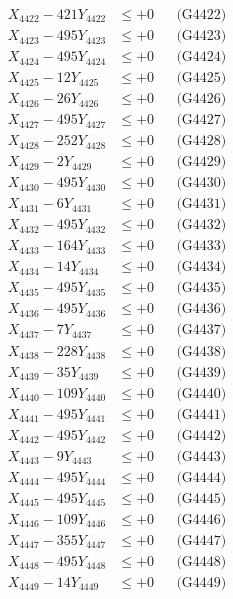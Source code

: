 \documentclass[a4paper,10pt]{article}
\begin{document}
{\begin{align}
X_{4422} - 421Y_{4422} &\leq +0 && \text{(G4422)} \\
X_{4423} - 495Y_{4423} &\leq +0 && \text{(G4423)} \\
X_{4424} - 495Y_{4424} &\leq +0 && \text{(G4424)} \\
X_{4425} - 12Y_{4425} &\leq +0 && \text{(G4425)} \\
X_{4426} - 26Y_{4426} &\leq +0 && \text{(G4426)} \\
X_{4427} - 495Y_{4427} &\leq +0 && \text{(G4427)} \\
X_{4428} - 252Y_{4428} &\leq +0 && \text{(G4428)} \\
X_{4429} - 2Y_{4429} &\leq +0 && \text{(G4429)} \\
X_{4430} - 495Y_{4430} &\leq +0 && \text{(G4430)} \\
\allowbreak
X_{4431} - 6Y_{4431} &\leq +0 && \text{(G4431)} \\
X_{4432} - 495Y_{4432} &\leq +0 && \text{(G4432)} \\
X_{4433} - 164Y_{4433} &\leq +0 && \text{(G4433)} \\
X_{4434} - 14Y_{4434} &\leq +0 && \text{(G4434)} \\
X_{4435} - 495Y_{4435} &\leq +0 && \text{(G4435)} \\
X_{4436} - 495Y_{4436} &\leq +0 && \text{(G4436)} \\
X_{4437} - 7Y_{4437} &\leq +0 && \text{(G4437)} \\
X_{4438} - 228Y_{4438} &\leq +0 && \text{(G4438)} \\
X_{4439} - 35Y_{4439} &\leq +0 && \text{(G4439)} \\
X_{4440} - 109Y_{4440} &\leq +0 && \text{(G4440)} \\
\allowbreak
X_{4441} - 495Y_{4441} &\leq +0 && \text{(G4441)} \\
X_{4442} - 495Y_{4442} &\leq +0 && \text{(G4442)} \\
X_{4443} - 9Y_{4443} &\leq +0 && \text{(G4443)} \\
X_{4444} - 495Y_{4444} &\leq +0 && \text{(G4444)} \\
X_{4445} - 495Y_{4445} &\leq +0 && \text{(G4445)} \\
X_{4446} - 109Y_{4446} &\leq +0 && \text{(G4446)} \\
X_{4447} - 355Y_{4447} &\leq +0 && \text{(G4447)} \\
X_{4448} - 495Y_{4448} &\leq +0 && \text{(G4448)} \\
X_{4449} - 14Y_{4449} &\leq +0 && \text{(G4449)} \\

\end{align}}
\end{document}
